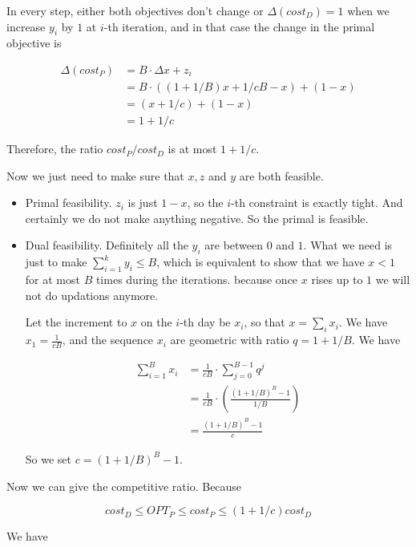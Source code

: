 \documentclass[11pt]{article}
\begin{document}
In every step, either both objectives don't change or $\Delta(cost_D)=1$ when we increase $y_i$ by $1$ at $i$-th iteration, and in that case the change in the primal objective is 

\begin{equation}
\begin{split}
\Delta(cost_P)&=B\cdot \Delta x+z_i \\
&=B\cdot ((1+1/B)x+1/cB-x)+(1-x) \\
&=(x+1/c)+(1-x) \\
&=1+1/c 
\end{split}
\end{equation}

Therefore, the ratio $cost_P/cost_D$ is at most $1+1/c$.

Now we just need to make sure that $x, z$ and $y$ are both feasible. 

\begin{itemize}
\item Primal feasibility. $z_i$ is just $1-x$, so the $i$-th constraint is exactly tight. And certainly we do not make anything negative. So the primal is feasible. 
\item Dual feasibility. Definitely all the $y_i$ are between $0$ and $1$. What we need is just to make $\sum_{i=1}^{k}{y_i}\le B$, which is equivalent to show that we have $x<1$ for at most $B$ times during the iterations. because once $x$ rises up to $1$ we will not do updations anymore. 

Let the increment to $x$ on the $i$-th day be $x_i$, so that $x=\sum_i{x_i}$. We have $x_1=\frac{1}{cB}$, and the sequence $x_i$ are geometric with ratio $q=1+1/B$. We have

\begin{equation}
\begin{split}
\sum_{i=1}^{B}{x_i} &= \frac{1}{cB} \cdot \sum_{j=0}^{B-1}{q^j} \\
&=\frac{1}{cB} \cdot \left(\frac{(1+1/B)^B-1}{1/B}\right) \\
&=\frac{(1+1/B)^B-1}{c}
\end{split}
\end{equation}

So we set $c=(1+1/B)^B-1$.
\end{itemize}

Now we can give the competitive ratio. Because 

$$cost_D\le OPT_P \le cost_P \le (1+1/c)cost_D$$

We have
\end{document}
